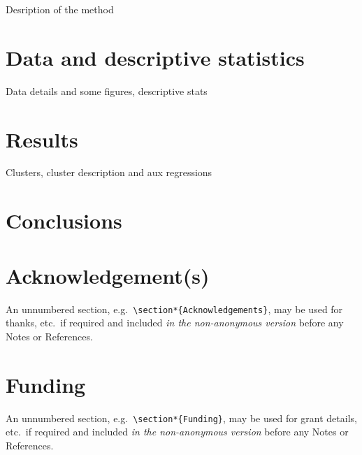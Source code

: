 \documentclass[]{interact}
\theoremstyle{plain}%
\theoremstyle{definition}
\theoremstyle{remark}
\begin{document}
Desription of the method

\hypertarget{data-and-descriptive-statistics}{%
\section{Data and descriptive
statistics}\label{data-and-descriptive-statistics}}

Data details and some figures, descriptive stats

\hypertarget{results}{%
\section{Results}\label{results}}

Clusters, cluster description and aux regressions

\hypertarget{conclusions}{%
\section{Conclusions}\label{conclusions}}

\hypertarget{acknowledgements}{%
\section*{Acknowledgement(s)}\label{acknowledgements}}

An unnumbered section,
e.g.~\texttt{\textbackslash{}section*\{Acknowledgements\}}, may be used
for thanks, etc.~if required and included \emph{in the non-anonymous
version} before any Notes or References.

\hypertarget{funding}{%
\section*{Funding}\label{funding}}

An unnumbered section,
e.g.~\texttt{\textbackslash{}section*\{Funding\}}, may be used for grant
details, etc.~if required and included \emph{in the non-anonymous
version} before any Notes or References.






\end{document}
